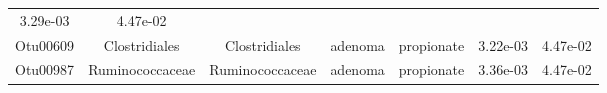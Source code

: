 \documentclass[11pt,]{article}
\begin{document}
\begin{longtable}[]{@{}ccccccc@{}}
\begin{minipage}[t]{0.09\columnwidth}
3.29e-03\strut
\end{minipage} & \begin{minipage}[t]{0.09\columnwidth}\centering\strut
4.47e-02\strut
\end{minipage}\tabularnewline
\begin{minipage}[t]{0.09\columnwidth}\centering\strut
Otu00609\strut
\end{minipage} & \begin{minipage}[t]{0.17\columnwidth}\centering\strut
Clostridiales\strut
\end{minipage} & \begin{minipage}[t]{0.17\columnwidth}\centering\strut
Clostridiales\strut
\end{minipage} & \begin{minipage}[t]{0.09\columnwidth}\centering\strut
adenoma\strut
\end{minipage} & \begin{minipage}[t]{0.11\columnwidth}\centering\strut
propionate\strut
\end{minipage} & \begin{minipage}[t]{0.09\columnwidth}\centering\strut
3.22e-03\strut
\end{minipage} & \begin{minipage}[t]{0.09\columnwidth}\centering\strut
4.47e-02\strut
\end{minipage}\tabularnewline
\begin{minipage}[t]{0.09\columnwidth}\centering\strut
Otu00987\strut
\end{minipage} & \begin{minipage}[t]{0.17\columnwidth}\centering\strut
Ruminococcaceae\strut
\end{minipage} & \begin{minipage}[t]{0.17\columnwidth}\centering\strut
Ruminococcaceae\strut
\end{minipage} & \begin{minipage}[t]{0.09\columnwidth}\centering\strut
adenoma\strut
\end{minipage} & \begin{minipage}[t]{0.11\columnwidth}\centering\strut
propionate\strut
\end{minipage} & \begin{minipage}[t]{0.09\columnwidth}\centering\strut
3.36e-03\strut
\end{minipage} & \begin{minipage}[t]{0.09\columnwidth}\centering\strut
4.47e-02\strut
\end{minipage}\tabularnewline

\end{longtable}
\end{document}
